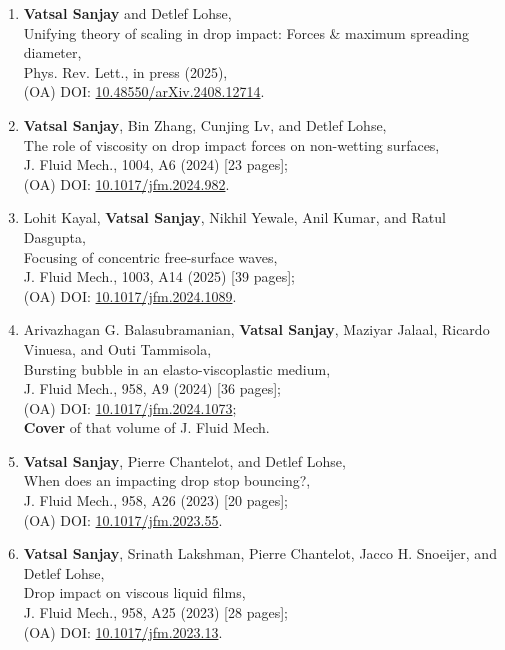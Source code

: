 \documentclass[10pt,a4paper,colorlinks,linkcolor=blue,urlcolor=blue,citecolor=blue]{moderncv}
\begin{document}
\begin{enumerate}[leftmargin=1.25em]
	\item \textbf{Vatsal Sanjay} and Detlef Lohse,\\
	Unifying theory of scaling in drop impact: Forces \& maximum spreading diameter,\\
	Phys. Rev. Lett., in press (2025),\\
	(OA) DOI: \href{https://doi.org/10.48550/arXiv.2408.12714}{10.48550/arXiv.2408.12714}.

	\item \textbf{Vatsal Sanjay}, Bin Zhang, Cunjing Lv, and Detlef Lohse,\\
	The role of viscosity on drop impact forces on non-wetting surfaces,\\
	J. Fluid Mech., 1004, A6 (2024) [23 pages];\\
	(OA) DOI: \href{https://doi.org/10.1017/jfm.2024.982}{10.1017/jfm.2024.982}.

	\item Lohit Kayal, \textbf{Vatsal Sanjay}, Nikhil Yewale, Anil Kumar, and Ratul Dasgupta,\\
	Focusing of concentric free-surface waves,\\
	J. Fluid Mech., 1003, A14 (2025) [39 pages];\\
	(OA) DOI: \href{https://doi.org/10.1017/jfm.2024.1089}{10.1017/jfm.2024.1089}.

	\item Arivazhagan G. Balasubramanian, \textbf{Vatsal Sanjay}, Maziyar Jalaal, Ricardo Vinuesa, and Outi Tammisola,\\
	Bursting bubble in an elasto-viscoplastic medium,\\
	J. Fluid Mech., 958, A9 (2024) [36 pages];\\
	(OA) DOI: \href{https://doi.org/10.1017/jfm.2024.1073}{10.1017/jfm.2024.1073};\\
	\textbf{Cover} of that volume of J. Fluid Mech.

	\item \textbf{Vatsal Sanjay}, Pierre Chantelot, and Detlef Lohse,\\
	When does an impacting drop stop bouncing?,\\
	J. Fluid Mech., 958, A26 (2023) [20 pages];\\
	(OA) DOI: \href{https://doi.org/10.1017/jfm.2023.55}{10.1017/jfm.2023.55}.

	\item \textbf{Vatsal Sanjay}, Srinath Lakshman, Pierre Chantelot, Jacco H. Snoeijer, and Detlef Lohse,\\
	Drop impact on viscous liquid films,\\
	J. Fluid Mech., 958, A25 (2023) [28 pages];\\
	(OA) DOI: \href{https://doi.org/10.1017/jfm.2023.13}{10.1017/jfm.2023.13}.


\end{enumerate}
\end{document}
